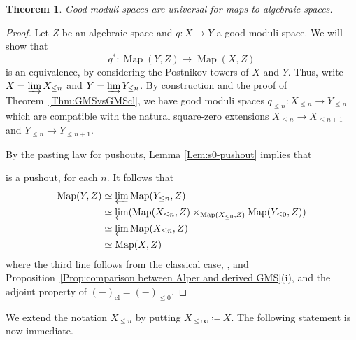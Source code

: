 \documentclass[a4paper,twoside,11pt]{amsart}
\theoremstyle{plain}
\newtheorem{theorem}{Theorem}[section]
\theoremstyle{definition}
\theoremstyle{remark}
\numberwithin{equation}{section}
\DeclareMathOperator{\Map}{Map}
\newcommand{\cl}{\mathrm{cl}} %
\begin{document}
\begin{theorem} \label{thm:universality of gms}
    Good moduli spaces are universal for maps to algebraic spaces.
\end{theorem}

\begin{proof}
    Let $Z$ be an algebraic space and $q \colon X \to Y$ a good moduli space. We will show that 
    \[ q^* \colon \Map(Y,Z) \to \Map(X,Z) \]
    is an equivalence, by considering the Postnikov towers of $X$ and $Y$. Thus, write $X = \varinjlim X_{\leq n}$ and $Y = \varinjlim Y_{\leq n}$. By construction and the proof of Theorem~\ref{Thm:GMSvsGMScl}, we have good moduli spaces $q_{\leq n} \colon X_{\leq n} \to Y_{\leq n}$ which are compatible with the natural square-zero extensions $X_{\leq n} \to X_{\leq n+1}$ and $Y_{\leq n} \to Y_{\leq n+1}$. 

    By the pasting law for pushouts, Lemma \ref{Lem:s0-pushout} implies that 
      \begin{center}
    \end{center}     
    is a pushout, for each $n$. It follows that
    \begin{align*}
        \Map(Y,Z) &\simeq \varprojlim \Map(Y_{\leq n}, Z) \\
        &\simeq \varprojlim (\Map(X_{\leq n},Z) \times_{\Map(X_{\leq 0},Z)} \Map(Y_{\leq 0},Z)) \\
        &\simeq \varprojlim \Map(X_{\leq n},Z) \\
        & \simeq \Map(X,Z)
    \end{align*}
    where the third line follows from the classical case, \cite[Theorem~3.12]{AHR2}, and Proposition~\ref{Prop:comparison between Alper and derived GMS}(i), and the adjoint property of $(-)_\cl = (-)_{\leq 0}$.
\end{proof}

We extend the notation $X_{\leq n}$ by putting $X_{\leq \infty} \coloneqq X$. The following statement is now immediate.
 
\end{document}
